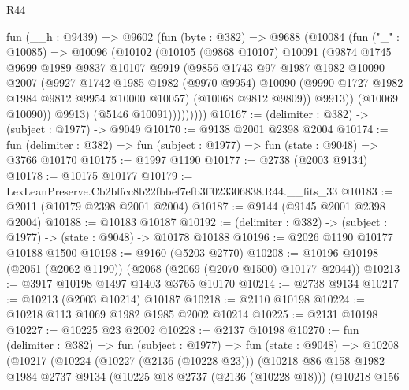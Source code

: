 \begin{lexlean}{R44}
\begin{coremodule}
            fun (__h : @9439) =>
            @9602
              (fun (byte : @382) =>
              @9688
                (@10084
                  (fun ("_" : @10085) =>
                  @10096
                    (@10102
                      (@10105
                        (@9868 @10107)
                        @10091
                        (@9874
                          @1745
                          @9699
                          @1989
                          @9837
                          @10107
                          @9919
                          (@9856
                            @1743
                            @97
                            @1987
                            @1982
                            @10090
                            @2007
                            (@9927
                              @1742
                              @1985
                              @1982
                              (@9970 @9954)
                              @10090
                              (@9990 @1727 @1982 @1984 @9812 @9954 @10000 @10057)
                              (@10068 @9812 @9809))
                            @9913))
                        (@10069 @10090))
                      @9913)
                    (@5146 @10091)))))))))
@10167 := (delimiter : @382) -> (subject : @1977) -> @9049
@10170 := @9138 @2001 @2398 @2004
@10174 := fun (delimiter : @382) => fun (subject : @1977) => fun (state : @9048) => @3766 @10170
@10175 := @1997 @1190
@10177 := @2738 (@2003 @9134)
@10178 := @10175 @10177
@10179 := LexLeanPreserve.Cb2bffcc8b22fbbef7efb3ff023306838.R44.__fits_33
@10183 := @2011 (@10179 @2398 @2001 @2004)
@10187 := @9144 (@9145 @2001 @2398 @2004)
@10188 := @10183 @10187
@10192 := (delimiter : @382) -> (subject : @1977) -> (state : @9048) -> @10178 @10188
@10196 := @2026 @1190 @10177 @10188 @1500
@10198 := @9160 (@5203 @2770)
@10208 := @10196 @10198 (@2051 (@2062 @1190)) (@2068 (@2069 (@2070 @1500) @10177 @2044))
@10213 := @3917 @10198 @1497 @1403 @3765 @10170
@10214 := @2738 @9134
@10217 := @10213 (@2003 @10214) @10187
@10218 := @2110 @10198
@10224 := @10218 @113 @1069 @1982 @1985 @2002 @10214
@10225 := @2131 @10198
@10227 := @10225 @23 @2002
@10228 := @2137 @10198
@10270 := fun (delimiter : @382) =>
  fun (subject : @1977) =>
  fun (state : @9048) =>
  @10208
    (@10217
      (@10224
        (@10227 (@2136 (@10228 @23)))
        (@10218
          @86
          @158
          @1982
          @1984
          @2737
          @9134
          (@10225 @18 @2737 (@2136 (@10228 @18)))
          (@10218
            @156

\end{coremodule}
\end{lexlean}
